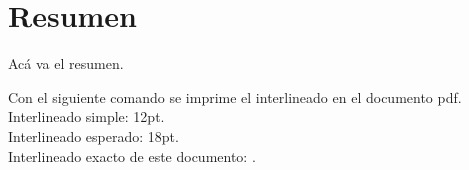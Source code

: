\chapter*{Resumen}









Acá va el resumen. 

Con el siguiente comando se imprime el interlineado en el documento pdf. \\
Interlineado simple: 12pt.\\
Interlineado esperado: 18pt.\\
Interlineado exacto de este documento: \the\baselineskip.